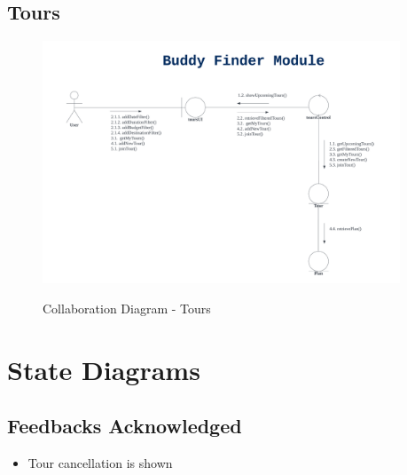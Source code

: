 \documentclass[12pt]{article}
\begin{document}
\subsection{Tours}
\begin{figure}[H]
    \centering
        \includegraphics[width=0.95\textwidth]{Collaboration Diagram/Tours.png}
        \label{fig:CollabTour}
    \caption{Collaboration Diagram - Tours}
\end{figure}

\newpage

\section{State Diagrams}
\subsection{Feedbacks Acknowledged}

\begin{itemize}
    \item Tour cancellation is shown
\end{itemize}
\end{document}
